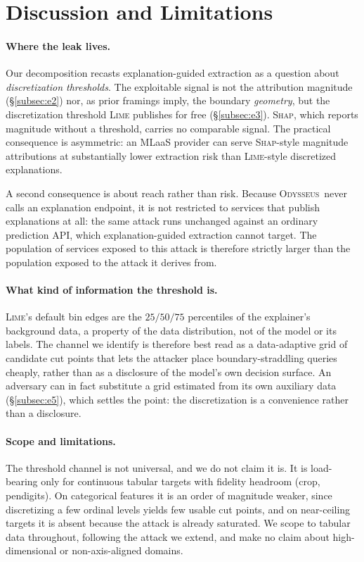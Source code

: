 \documentclass[sigconf,anonymous,review]{acmart}
\newcommand{\sys}{\textsc{Odysseus}}
\begin{document}
\section{Discussion and Limitations}
\label{sec:discussion}
\paragraph{Where the leak lives.} Our decomposition recasts explanation-guided extraction as a
question about \emph{discretization thresholds}. The exploitable signal is not the attribution magnitude
(\S\ref{subsec:e2}) nor, as prior framings imply, the boundary \emph{geometry}, but the discretization
threshold \textsc{Lime} publishes for free (\S\ref{subsec:e3}). \textsc{Shap}, which reports magnitude
without a threshold, carries no comparable signal. The practical consequence is asymmetric: an MLaaS
provider can serve \textsc{Shap}-style magnitude attributions at substantially lower extraction risk
than \textsc{Lime}-style discretized explanations.

A second consequence is about reach rather than risk. Because \sys\ never calls an explanation
endpoint, it is not restricted to services that publish explanations at all: the same attack runs
unchanged against an ordinary prediction API, which explanation-guided extraction cannot target. The
population of services exposed to this attack is therefore strictly larger than the population exposed
to the attack it derives from.

\paragraph{What kind of information the threshold is.} \textsc{Lime}'s default bin edges are the
$25/50/75$ percentiles of the explainer's background data, a property of the data distribution, not of the model or its labels. The channel we identify is therefore best read as a data-adaptive grid of
candidate cut points that lets the attacker place boundary-straddling queries cheaply, rather than as
a disclosure of the model's own decision surface. An adversary can in fact substitute a grid estimated
from its own auxiliary data (\S\ref{subsec:e5}), which settles the point: the discretization is a
convenience rather than a disclosure.

\paragraph{Scope and limitations.} The threshold channel is not universal, and we do not claim it is.
It is load-bearing only for continuous tabular targets with fidelity headroom (crop, pendigits). On categorical features it is an order of magnitude weaker, since discretizing a few ordinal levels
yields few usable cut points, and on near-ceiling targets it is absent because the attack is already
saturated. We scope to tabular data throughout, following the attack we extend, and make no
claim about high-dimensional or non-axis-aligned domains.
\end{document}
